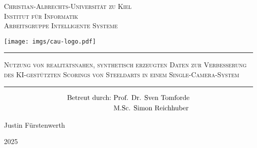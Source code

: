 
\begin{titlepage}
    \centering

    {\LARGE \scshape Christian-Albrechts-Universität zu Kiel}\\
    \vspace{0.25cm}
    {\large \scshape Institut für Informatik}\\
    \vspace{0.1cm}
    {\large \scshape Arbeitsgruppe Intelligente Systeme}

    \vfill

    \texttt{[image: imgs/cau-logo.pdf]}

    \vfill

    {\Huge \scshape {}}

    \vspace{0.75cm}

    \hrule
    \vspace{0.5cm}
    {\LARGE \scshape Nutzung von realitätsnahen, synthetisch erzeugten Daten zur Verbesserung des KI-gestützten Scorings von Steeldarts in einem Single-Camera-System}
    \vspace{0.5cm}
    \hrule
    \begin{align*}
        \text{Betreut durch:} & \text{\,\,Prof. Dr. Sven Tomforde} \\
                              & \text{\,\,M.Sc. Simon Reichhuber}
    \end{align*}

    \vfill

    {\Large Justin Fürstenwerth}

    \vspace{0.2cm}

    {\large 2025}




\end{titlepage}
